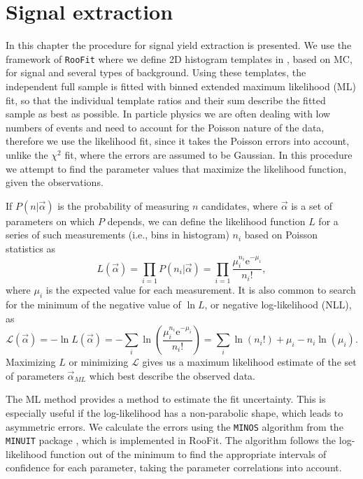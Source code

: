 \chapter{Signal extraction}
In this chapter the procedure for signal yield extraction is presented. We use the framework of \texttt{RooFit} \cite{verkerke2006roofit} where we define 2D histogram templates in \vars, based on MC, for signal and several types of background. Using these templates, the independent full sample is fitted with binned extended maximum likelihood (ML) fit, so that the individual template ratios and their sum describe the fitted sample as best as possible. In particle physics we are often dealing with low numbers of events and need to account for the Poisson nature of the data, therefore we use the likelihood fit, since it takes the Poisson errors into account, unlike the $\chi^2$ fit, where the errors are assumed to be Gaussian. In this procedure we attempt to find the parameter values that maximize the likelihood function, given the observations.

If $P(n\vert\vec \alpha)$ is the probability of measuring $n$ candidates, where $\vec \alpha$ is a set of parameters on which $P$ depends, we can define the likelihood function $L$ for a series of such measurements (i.e., bins in histogram) $n_i$ based on Poisson statistics as
\begin{equation}
\label{eq:ML}
L(\vec \alpha) = \prod_{i=1} P(n_i|\vec \alpha) = \prod_{i=1} \frac{\mu_i^{n_i}\mathrm{e}^{-\mu_i}}{n_i!},
\end{equation}
where $\mu_i$ is the expected value for each measurement. It is also common to search for the minimum of the negative value of $\ln L$, or negative log-likelihood (NLL), as
\begin{equation}
\label{eq:NLL}
\mathcal{L}(\vec \alpha) = -\ln L(\vec \alpha) = -\sum_{i}\ln \left(\frac{\mu_i^{n_i}\mathrm{e}^{-\mu_i}}{n_i!}\right) = \sum_{i}\ln(n_i!) + \mu_i - n_i\ln(\mu_i).
\end{equation}
Maximizing $L$ or minimizing $\mathcal{L}$ gives us a maximum likelihood estimate of the set of parameters $\vec \alpha_{ML}$ which best describe the observed data. 

The ML method provides a method to estimate the fit uncertainty. This is especially useful if the log-likelihood has a non-parabolic shape, which leads to asymmetric errors. We calculate the errors using the \texttt{MINOS} algorithm from the \texttt{MINUIT} package \cite{James:1994vla}, which is implemented in RooFit. The algorithm follows the log-likelihood function out of the minimum to find the appropriate intervals of confidence for each parameter, taking the parameter correlations into account. 

